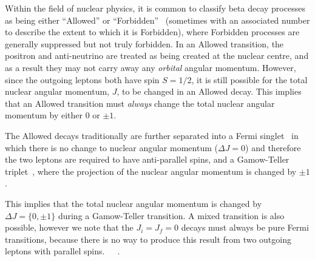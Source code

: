 Within the field of nuclear physics, it is common to classify beta decay processes as being either ``Allowed'' or ``Forbidden''~ (sometimes with an associated number to describe the extent to which it is Forbidden), where Forbidden processes are generally suppressed but not truly forbidden.  In an Allowed transition, the positron and anti-neutrino are treated as being created at the nuclear centre, and as a result they may not carry away any \emph{orbital} angular momentum.  However, since the outgoing leptons both have spin $S=1/2$, it is still possible for the total nuclear angular momentum, $J$, to be changed in an Allowed decay.  This implies that an Allowed transition must \emph{always} change the total nuclear angular momentum by either $0$ or $\pm1$.  
~

The Allowed decays traditionally are further separated into a Fermi singlet~ in which there is no change to nuclear angular momentum ($\Delta J = 0$) and therefore the two leptons are required to have anti-parallel spins, and a Gamow-Teller triplet~\cite{severijns_beck_cuncic_2006}, where the projection of the nuclear angular momentum is changed by $\pm1$.%

This implies that the total nuclear angular momentum is changed by $\Delta J = \{0, \pm1\}$ during a Gamow-Teller transition.  A mixed transition is also possible, however we note that the $J_i = J_f = 0$ decays must always be pure Fermi transitions, because there is no way to produce this result from two outgoing leptons with parallel spins.~\cite{krane}~\cite{wong1990}~\cite{severijns_beck_cuncic_2006}.

